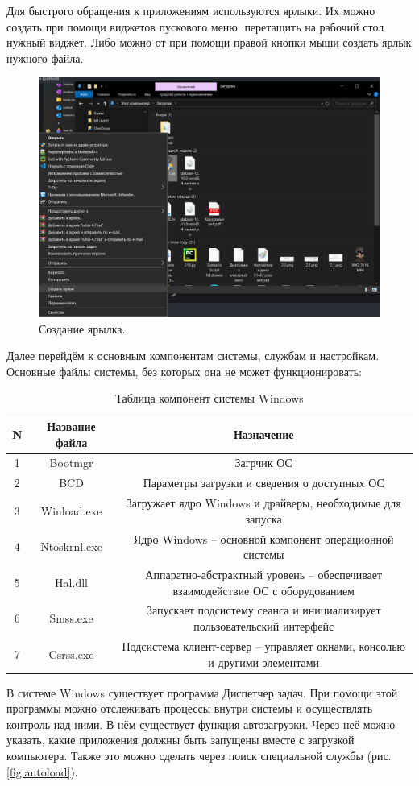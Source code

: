 Для быстрого обращения к приложениям используются ярлыки. Их можно создать при помощи виджетов пускового меню: перетащить на рабочий стол нужный виджет. Либо можно от при помощи правой кнопки мыши создать ярлык нужного файла.

\begin{figure}[h!]
    \centering
    \includegraphics[width=0.5\linewidth]{Pic/lab1/photo_2025-05-21_08-15-12.jpg}
    \caption{Создание ярылка.}
    \label{fig:yrl}
\end{figure}

Далее перейдём к основным компонентам системы, службам и настройкам. Основные файлы системы, без которых она не может функционировать:
\begin{table}[h!]
    \centering
    \caption{Таблица компонент системы Windows}
    \label{tab:tab 1.1}
    \vspace{10}
    \begin{tabular}{|c|c|c|}
\hline
N&Название файла&Назначение\\
\hline
1&Bootmgr&Загрчик ОС\\
\hline
2&BCD&Параметры загрузки и сведения о доступных ОС\\
\hline
3&Winload.exe&Загружает ядро Windows и драйверы, необходимые для запуска\\
\hline
4&Ntoskrnl.exe&Ядро Windows – основной компонент операционной системы\\
\hline
5&Hal.dll&Аппаратно-абстрактный уровень – обеспечивает взаимодействие ОС с оборудованием\\
\hline
6&Smss.exe&Запускает подсистему сеанса и инициализирует пользовательский интерфейс\\
\hline
7&Csrss.exe&Подсистема клиент-сервер – управляет окнами, консолью и другими элементами\\
\hline
    \end{tabular}
\end{table}

В системе Windows существует программа Диспетчер задач. При помощи этой программы можно отслеживать процессы внутри системы и осуществлять контроль над ними. В нём существует функция автозагрузки. Через неё можно указать, какие приложения должны быть запущены вместе с загрузкой компьютера. Также это можно сделать через поиск специальной службы (рис. \ref{fig:autoload}). 


